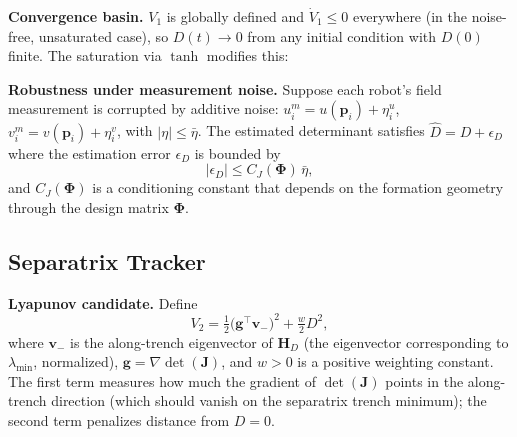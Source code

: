 \documentclass[lettersize,journal]{IEEEtran}
\begin{document}

\textbf{Convergence basin.} $V_1$ is globally defined and $\dot{V}_1 \leq 0$
everywhere (in the noise-free, unsaturated case), so $D(t) \to 0$ from any
initial condition with $D(0)$ finite. The saturation via $\tanh$ modifies this:


\textbf{Robustness under measurement noise.} Suppose each robot's field
measurement is corrupted by additive noise: $u_i^m = u(\mathbf{p}_i) + \eta_i^u$,
$v_i^m = v(\mathbf{p}_i) + \eta_i^v$, with $|\eta| \leq \bar{\eta}$.
The estimated determinant satisfies $\hat{D} = D + \epsilon_D$ where the
estimation error $\epsilon_D$ is bounded by
\begin{equation}
    |\epsilon_D| \leq C_J(\boldsymbol{\Phi})\,\bar{\eta}, \label{eq:noise_bound}
\end{equation}
and $C_J(\boldsymbol{\Phi})$ is a conditioning constant that depends on the
formation geometry through the design matrix $\boldsymbol{\Phi}$.


\subsection{Separatrix Tracker}
\label{sec:stab_sep}

\textbf{Lyapunov candidate.} Define
\begin{equation}
    V_2 = \tfrac{1}{2}\bigl(\mathbf{g}^\top \mathbf{v}_-\bigr)^2
          + \tfrac{w}{2} D^2, \label{eq:V2}
\end{equation}
where $\mathbf{v}_-$ is the along-trench eigenvector of $\mathbf{H}_D$ (the
eigenvector corresponding to $\lambda_{\min}$, normalized), $\mathbf{g} =
\nabla\det(\mathbf{J})$, and $w > 0$ is a positive weighting constant.
The first term measures how much the gradient of $\det(\mathbf{J})$ points
in the along-trench direction (which should vanish on the separatrix trench
minimum); the second term penalizes distance from $D = 0$.
\end{document}
